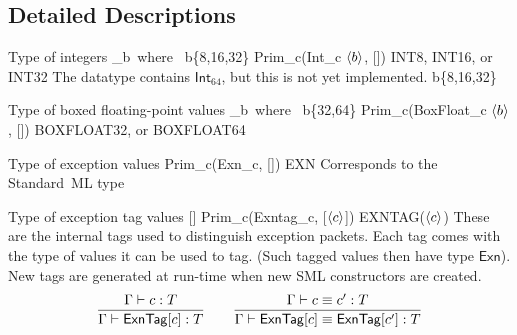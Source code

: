 \documentclass[12pt,twoside,fleqn]{article}
\begin{document}
\irule
  {}
  {}

\irule
  {\qquad
   }
  {}

\subsection{Detailed Descriptions}

  {Type of integers}
  {_b\quad\mbox{\ where\ } b\in\{8,16,32\}}
  {Prim\_c(Int\_c $\langle{b}\rangle$, [])}
  {INT8, INT16, \textrm{or} INT32}
  {The datatype contains $\mathsf{Int}_{64}$, but this is not yet
   implemented.}
  {\irule
    {\validcontext{\context}\qquad b\in\{8,16,32\}}
     {}}

  {Type of boxed floating-point values}
  {_b\quad\mbox{\ where\ } b\in\{32,64\}}
  {Prim\_c(BoxFloat\_c $\langle{b}\rangle$, [])}
  {BOXFLOAT32, \mbox{or} BOXFLOAT64}
  {}
  {\irule
    {\validcontext{\context}}
     {}}

\newcommand{\cexn}{\mathsf{Exn}}
  {Type of exception values}
  {\cexn}
  {Prim\_c(Exn\_c, [])}
  {EXN}
  {Corresponds to the Standard~ML type }
  {\irule
    {\validcontext{\context}}
    {\validconstructor{\context}{\cexn}{\ktype}}}

\newcommand{\cexntag}[1]{\mathsf{ExnTag}[#1]}
  {Type of exception tag values}
  {\cexntag{\constructor}}
  {Prim\_c(Exntag\_c, [$\langle{c}\rangle$])}
  {EXNTAG($\langle{c}\rangle$)}
  {These are the internal tags used to distinguish exception packets.
   Each tag comes with the type of values it can be used to tag.
   (Such tagged values then have type $\mathsf{Exn}$).  New tags
   are generated at run-time when new SML  constructors
   are created.}
  {\[\frac
    {\Gamma\vdash c : T}
    {\Gamma\vdash \mathsf{ExnTag}[c] : T}
   \qquad
   \frac
    {\Gamma\vdash c \equiv c' : T}
    {\Gamma\vdash \mathsf{ExnTag}[c] \equiv \mathsf{ExnTag}[c'] : T}
  \]}   
\end{document}
